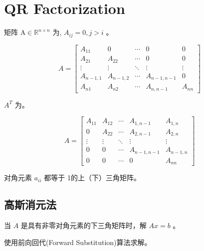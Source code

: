 \chapter{QR Factorization}

\begin{definition}
    矩阵 $ \mathrm{A} \in \mathbb{R}^{n \times n} $ 为, $ A_{i j}=0, j>i $ 。

    $$ A=\left[\begin{array}{ccccc}A_{11} & 0 & \cdots & 0 & 0 \\ A_{21} & A_{22} & \cdots & 0 & 0 \\ \vdots & \vdots & \ddots & \vdots & \vdots \\ A_{n-1,1} & A_{n-1,2} & \cdots & A_{n-1, n-1} & 0 \\ A_{n 1} & A_{n 2} & \cdots & A_{n, n-1} & A_{n n}\end{array}\right] $$
\end{definition}

\begin{definition}
    $ A^{T} $ 为。

    $$ A=\left[\begin{array}{ccccc}A_{11} & A_{12} & \cdots & A_{1, n-1} & A_{1, n} \\ 0 & A_{22} & \cdots & A_{2, n-1} & A_{2, n} \\ \vdots & \vdots & \ddots & \vdots & \vdots \\ 0 & 0 & \cdots & A_{n-1, n-1} & A_{n-1, n} \\ 0 & 0 & \cdots & 0 & A_{n n}\end{array}\right] $$
\end{definition}

\begin{definition}
    对角元素 $ a_{i i} $ 都等于 1的上（下）三角矩阵。
\end{definition}

\section{高斯消元法}

\begin{problem}
    当 $ A $ 是具有非零对角元素的下三角矩阵时，解 $ A x=b $ 。
\end{problem}

使用前向回代(Forward Substitution)算法求解。

